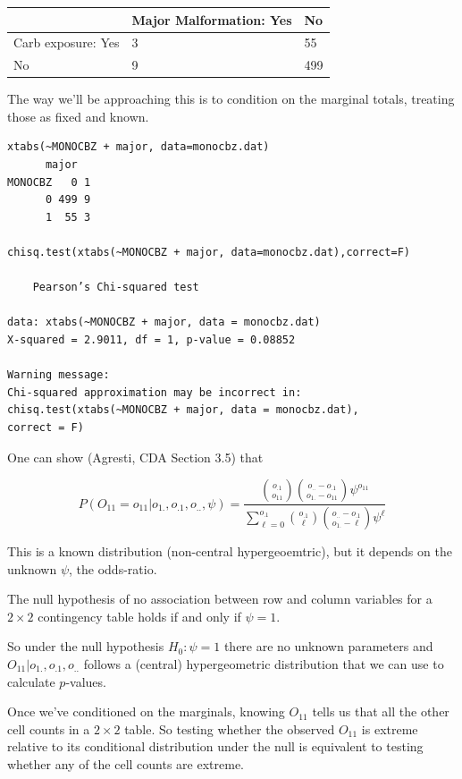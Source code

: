 \documentclass[
  letterpaper,
  DIV=11,
  numbers=noendperiod]{scrreport}
\begin{document}
\begin{longtable}[]{@{}lll@{}}
\toprule()
& Major Malformation: Yes & No \\
\midrule()
\endhead
Carb exposure: Yes & 3 & 55 \\
No & 9 & 499 \\
\bottomrule()
\end{longtable}

The way we'll be approaching this is to condition on the marginal
totals, treating those as fixed and known.

\begin{verbatim}
xtabs(~MONOCBZ + major, data=monocbz.dat)
      major
MONOCBZ   0 1
      0 499 9
      1  55 3

chisq.test(xtabs(~MONOCBZ + major, data=monocbz.dat),correct=F)

    Pearson’s Chi-squared test

data: xtabs(~MONOCBZ + major, data = monocbz.dat)
X-squared = 2.9011, df = 1, p-value = 0.08852

Warning message:
Chi-squared approximation may be incorrect in:
chisq.test(xtabs(~MONOCBZ + major, data = monocbz.dat),
correct = F)
\end{verbatim}

One can show (Agresti, CDA Section 3.5) that

\[P(O_{11} = o_{11} | o_{1.}, o_{.1}, o_{..}, \psi) = 
\frac{
  {o_{.1} \choose o_{11}} {o_{..} - o_{.1} \choose {o_{1.} - o_{11}} }\psi^{o_{11}}
  }{
    \sum_{\ell=0}^{o_{.1}} { o_{.1} \choose \ell} { o_{..} - o_{.1} \choose o_{1.} - \ell } \psi^{\ell}
  }
\]

This is a known distribution (non-central hypergeoemtric), but it
depends on the unknown \(\psi\), the odds-ratio.

The null hypothesis of no association between row and column variables
for a \(2\times 2\) contingency table holds if and only if \(\psi = 1\).

So under the null hypothesis \(H_0 : \psi = 1\) there are no unknown
parameters and \(O_{11} |o_{1.}, o_{.1}, o_{..}\) follows a (central)
hypergeometric distribution that we can use to calculate \(p\)-values.

Once we've conditioned on the marginals, knowing \(O_{11}\) tells us
that all the other cell counts in a \(2 \times 2\) table. So testing
whether the observed \(O_{11}\) is extreme relative to its conditional
distribution under the null is equivalent to testing whether any of the
cell counts are extreme.
\end{document}
